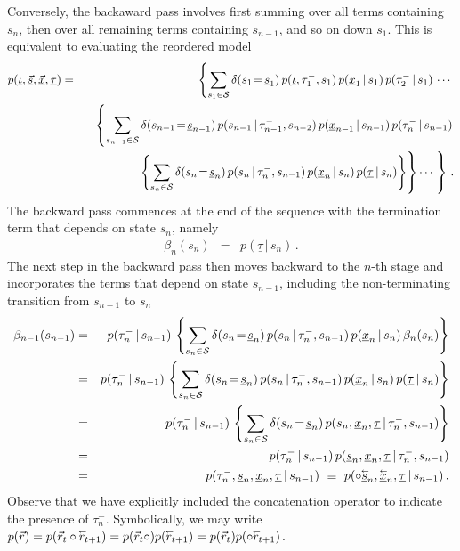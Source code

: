 \documentclass[a4paper]{article}
\newcommand{\rvec}[1]{\accentset{\leftarrow}{#1}}
\newcommand{\ui}{\underline{\iota}}
\newcommand{\ut}{\underline{\tau}}
\begin{document}
Conversely, the backaward pass involves first summing over all terms containing $s_n$,
then over all remaining terms containing $s_{n-1}$, and so on down $s_1$.
This is equivalent to evaluating the reordered model
\begin{eqnarray}
   p(\ui,\underline{\vec{s}},\underline{\vec{x}},\ut) 
& = & 
   \left\{\sum_{s_1\in{\cal S}}\delta(s_1\!=\!\underline{s}_1)\,
p(\ui,\tau^-_1,s_1)\,p(\underline{x}_1\,|\,s_1)\,p(\tau^-_2\,|\,s_1)\,
\cdots\right.
\nonumber\\&&
\;\;\;\left\{\sum_{s_{n-1}\in{\cal S}}\delta(s_{n-1}\!=\!\underline{s}_{n-1})\,
p(s_{n-1}\,|\,\tau^-_{n-1},s_{n-2})\,p(\underline{x}_{n-1}\,|\,s_{n-1})\,p(\tau^-_n\,|\,s_{n-1})\right.
\nonumber\\&&
\hspace*{4mm}
\left.\rule{0pt}{7mm}\left\{\sum_{s_n\in{\cal S}}\delta(s_n\!=\!\underline{s}_n)\,
p(s_n\,|\,\tau^-_n,s_{n-1})\,p(\underline{x}_{n}\,|\,s_n)
\,p(\ut\,|\,s_n)\right\}\right\}
\cdots\left.\rule{0pt}{7mm}\right\}
\,.
\label{eq:backward}
\end{eqnarray}
The backward pass commences at the end of the sequence with the termination term that depends on state $s_n$, namely 
\begin{eqnarray}
  \beta_n(s_n) & = & p(\ut\,|\,s_n)\,.
\label{eq:_beta_n}
\end{eqnarray}
The next step in the backward pass then moves backward to the $n$-th stage and incorporates the terms that depend on state $s_{n-1}$, including the
non-terminating transition from $s_{n-1}$ to $s_n$
\begin{eqnarray}
  \beta_{n-1}(s_{n-1}) & = &
p(\tau^-_n\,|\,s_{n-1})\,\left\{\sum_{s_n\in{\cal S}}\delta(s_n\!=\!\underline{s}_n)\,
p(s_n\,|\,\tau^-_n,s_{n-1})\,p(\underline{x}_{n}\,|\,s_n)
\,\beta_n(s_n)\right\}
\nonumber\\&=&
p(\tau^-_n\,|\,s_{n-1})\,\left\{\sum_{s_n\in{\cal S}}\delta(s_n\!=\!\underline{s}_n)\,
p(s_n\,|\,\tau^-_n,s_{n-1})\,p(\underline{x}_{n}\,|\,s_n)
\,p(\ut\,|\,s_n)\right\}
\nonumber\\&=&
p(\tau^-_n\,|\,s_{n-1})\,\left\{\sum_{s_n\in{\cal S}}\delta(s_n\!=\!\underline{s}_n)\,
p(s_n,\underline{x}_{n},\ut\,|\,\tau^-_n,s_{n-1})\right\}
\nonumber\\&=&
p(\tau^-_n\,|\,s_{n-1})\,p(\underline{s}_n,\underline{x}_n,\ut\,|\,\tau^-_n,s_{n-1})
\nonumber\\&=&
p(\tau^-_n,\underline{s}_n,\underline{x}_n,\ut\,|\,s_{n-1})
~\equiv~p(\circ\underline{\rvec{s}}_n,\underline{\rvec{x}}_n,\ut\,|\,s_{n-1})\,.
\end{eqnarray}
Observe that we have explicitly included the concatenation operator to indicate the presence of $\tau^-_{n}$. 
Symbolically, we may write $p(\vec{r})=p(\vec{r}_t\circ\rvec{r}_{t+1})=p(\vec{r}_t\circ)p(\rvec{r}_{t+1})=p(\vec{r}_t)p(\circ\rvec{r}_{t+1})$.
\end{document}
